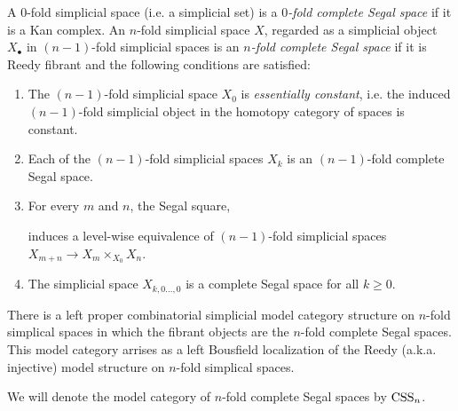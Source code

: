 \documentclass[a4paper]{amsart}
\begin{document}
\begin{definition}
		A $0$-fold simplicial space (i.e. a simplicial set) is a {\em $0$-fold complete Segal space} if it is a Kan complex. An $n$-fold simplicial space $X$, regarded as a simplicial object $X_\bullet$ in $(n-1)$-fold simplicial spaces is an {\em $n$-fold complete Segal space} if it is Reedy fibrant and the following conditions are satisfied:
		\begin{enumerate}
			\item The $(n-1)$-fold simplicial space $X_0$ is {\em essentially constant}, i.e. the induced $(n-1)$-fold simplicial object in the homotopy category of spaces is constant. 
			\item Each of the $(n-1)$-fold simplicial spaces $X_k$ is an $(n-1)$-fold complete Segal space.
			\item For every $m$ and $n$, the Segal square,
			\begin{center}
			\end{center}
			induces a level-wise 
			equivalence of $(n-1)$-fold simplicial spaces $X_{m+n} \to X_m \times_{X_0} X_n$.
			\item The simplicial space $X_{k, 0 \dots, 0}$ is a complete Segal space for all $k\geq 0$. 
		\end{enumerate}
\end{definition}

\begin{theorem}
	There is a left proper combinatorial simplicial model category structure on $n$-fold simplical spaces in which the fibrant objects are the $n$-fold complete Segal spaces. This model category arrises as a left Bousfield localization of the Reedy (a.k.a. injective) model structure on $n$-fold simplical spaces. 
\end{theorem}

\noindent We will denote the model category of $n$-fold complete Segal spaces by $\mathrm{CSS}_n$.  
\end{document}
